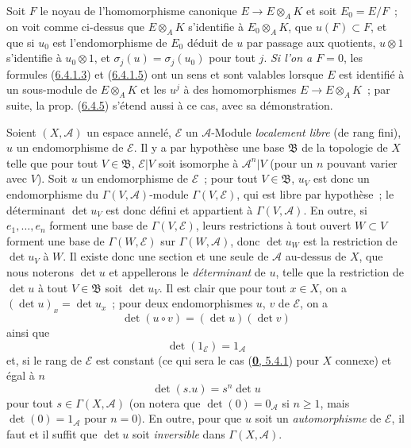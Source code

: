 \begin{remark}[6.4.7]
Soit $F$ le noyau de l'homomorphisme canonique $E\to E\otimes_AK$ et soit
$E_0=E/F$~; on voit comme ci-dessus que $E\otimes_AK$ s'identifie à
$E_0\otimes_AK$, que $u(F)\subset F$, et que si $u_0$ est l'endomorphisme de
$E_0$ déduit de $u$ par passage aux quotients, $u\otimes1$ s'identifie à
$u_0\otimes1$, et $\sigma_j(u)=\sigma_j(u_0)$ pour tout $j$. \emph{Si l'on a
$F=0$}, les formules (\hyperref[II.6.4.1.3-fr]{6.4.1.3}) et
(\hyperref[II.6.4.1.5-fr]{6.4.1.5}) ont un sens et sont valables lorsque $E$
est identifié à un sous-module de $E\otimes_AK$ et les $u^j$ à des
homomorphismes $E\to E\otimes_AK$~; par suite, la prop.
(\hyperref[II.6.4.5-fr]{6.4.5}) s'étend aussi à ce cas, avec sa démonstration.
\end{remark}

\begin{env}[6.4.8]
\label{II.6.4.8-fr}
Soient $(X,\mathcal{A})$ un espace annelé, $\mathcal{E}$ un
$\mathcal{A}$-Module \emph{localement libre} (de rang fini), $u$ un
endomorphisme de $\mathcal{E}$. Il y a par hypothèse une base $\mathfrak{B}$
de la topologie de $X$ telle que pour tout $V\in\mathfrak{B}$,
$\mathcal{E}|V$ soit isomorphe à $\mathcal{A}^n|V$ (pour un $n$ pouvant varier
avec $V$). Soit $u$ un endomorphisme de $\mathcal{E}$~; pour tout
$V\in\mathfrak{B}$, $u_V$ est donc un endomorphisme du
$\Gamma(V,\mathcal{A})$-module $\Gamma(V,\mathcal{E})$, qui est libre par
hypothèse~; le déterminant $\det u_V$ est donc défini et appartient à
$\Gamma(V,\mathcal{A})$. En outre, si $e_1,\ldots,e_n$ forment une base de
$\Gamma(V,\mathcal{E})$, leurs restrictions à tout ouvert $W\subset V$
forment une base de $\Gamma(W,\mathcal{E})$ sur $\Gamma(W,\mathcal{A})$,
donc $\det u_W$ est la restriction de $\det u_V$ à $W$. Il existe donc une
section et une seule de $\mathcal{A}$ au-dessus de $X$, que nous noterons
$\det u$ et appellerons le \emph{déterminant} de $u$, telle que la restriction
de $\det u$ à tout $V\in\mathfrak{B}$ soit $\det u_V$. Il est clair que pour
tout $x\in X$, on a $(\det u)_x=\det u_x$~; pour deux endomorphismes $u$, $v$
de $\mathcal{E}$, on a
\[
\label{II.6.4.8.1-fr}
\det(u\circ v)=(\det u)(\det v)
\tag{6.4.8.1}
\]
ainsi que
\[
\label{II.6.4.8.2-fr}
\det(1_{\mathcal{E}})=1_{\mathcal{A}}
\tag{6.4.8.2}
\]
et, si le rang de $\mathcal{E}$ est constant (ce qui sera le cas
(\hyperref[0.5.4.1-fr]{\textbf{0}, 5.4.1}) pour $X$ connexe) et égal à $n$
\[
\label{II.6.4.8.3-fr}
\det(s.u)=s^n\det u
\tag{6.4.8.3}
\]
pour tout $s\in\Gamma(X,\mathcal{A})$ (on notera que
$\det(0)=0_{\mathcal{A}}$ si $n\geq1$, mais $\det(0)=1_{\mathcal{A}}$ pour
$n=0$). En outre, pour que $u$ soit un \emph{automorphisme} de
$\mathcal{E}$, il faut et il suffit que $\det u$ soit \emph{inversible} dans
$\Gamma(X,\mathcal{A})$.


\end{env}
